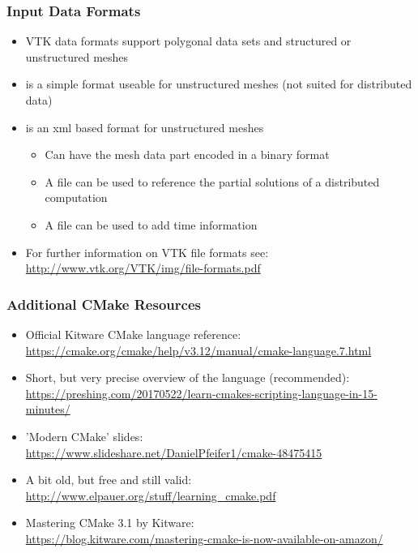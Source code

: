 \begin{frame}

  \frametitle{Input Data Formats}

    \begin{itemize}

      \item VTK data formats support polygonal data sets and structured or unstructured meshes 

      \item {} is a simple format useable for unstructured meshes (not suited for distributed data)  

      \item {} is an xml based format for unstructured meshes   
    \begin{itemize}

      \item Can have the mesh data part encoded in a binary format   

      \item A  file can be used to reference the partial solutions of a distributed computation   

      \item A  file can be used to add time information   

    \end{itemize}

    \item For further information on VTK file formats see:
      \url{http://www.vtk.org/VTK/img/file-formats.pdf}

  \end{itemize}

\end{frame}

\begin{frame}[squeeze]

  \frametitle{Additional CMake Resources}

  \begin{itemize}
      \item Official Kitware CMake language reference:\\
        \url{https://cmake.org/cmake/help/v3.12/manual/cmake-language.7.html}
      \item Short, but very precise overview of the language (recommended):\\
        \url{https://preshing.com/20170522/learn-cmakes-scripting-language-in-15-minutes/}
      \item 'Modern CMake' slides:\\
        \url{https://www.slideshare.net/DanielPfeifer1/cmake-48475415}
      \item A bit old, but free and still valid:\\
        \url{http://www.elpauer.org/stuff/learning_cmake.pdf}
      \item Mastering CMake 3.1 by Kitware:\\
        \url{https://blog.kitware.com/mastering-cmake-is-now-available-on-amazon/}
  \end{itemize}

\end{frame}

